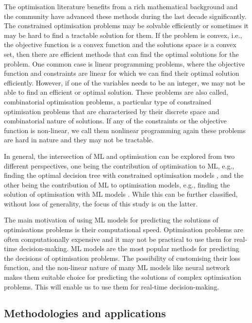 \documentclass[graybox]{svmult}
\begin{document}
The optimisation literature benefits from a rich mathematical background and the community have advanced these methods during the last decade significantly. The constrained optimisation problems may be solvable efficiently or sometimes it may be hard to find a tractable solution for them.  If the problem is convex, i.e., the objective function is a convex function and the solutions space is a convex set, then there are efficient methods that can find the optimal solutions for the problem. One common case is linear programming problems, where the objective function and constraints are linear for which we can find their optimal solution efficiently. However, if one of the variables needs to be an integer, we may not be able to find an efficient or optimal solution. These problems are also called, combinatorial optimisation problems, a particular type of constrained optimisation problems that are characterised by their discrete space and combinatorial nature of solutions. If any of the constraints or the objective function is non-linear, we call them nonlinear programming again these problems are hard in nature and they may not be tractable. 

In general, the intersection of ML and optimisation can be explored from two different perspectives, one being the contribution of optimisation to ML, e.g., finding the optimal decision tree with constrained optimisation models \cite{bertsimas2019machine, Daume_undated-vo, Khalil_undated-qm}, and the other being the contribution of ML to optimisation models, e.g., finding the solution of optimisation with ML models \cite{abolghasemi2021effectively,bertsimas2019machine}.  While this can be further classified, without loss of generality, the focus of this study is on the latter.

The main motivation of using ML models for predicting the solutions of optimisations problems is their computational speed. Optimisation problems are often computationally expensive and it may not be practical to use them for real-time decision-making. ML models are the most popular methods for predicting the decisions of optimisation problems. The possibility of customising their loss function, and the non-linear nature of many ML models like neural network makes them suitable choice for predicting the solutions of complex optimisation problems. This will enable us to use them for real-time decision-making. 


\subsection{Methodologies and applications}\label{method2}
 
\end{document}
